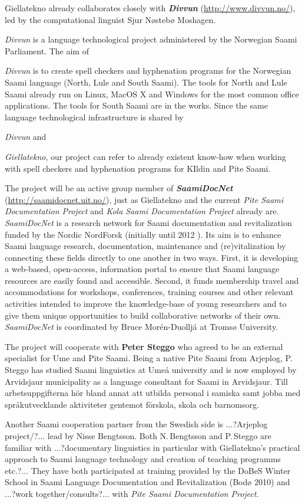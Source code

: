 \documentclass[a4paper,12pt]{article}
\begin{document}
Giellatekno already collaborates closely with \textit{\textbf{Divvun}} (\url{http://www.divvun.no/}), led by the computational linguist Sjur Nøstebø Moshagen. {\textit{Divvun} is a language technological project administered by the Norwegian Saami Parliament. The aim of {\textit{Divvun} is to create spell checkers and hyphenation programs for the Norwegian Saami language (North, Lule and South Saami). The tools for North and Lule Saami already run on Linux, MacOS X and Windows for the most common office applications. The tools for South Saami are in the works. Since the same language technological infrastructure is shared by {\textit{Divvun} and {\textit{Giellatekno}, our project can refer to already existent know-how when working with spell checkers and hyphenation programs for KIldin and Pite Saami.

The project will be an active group member of \textit{\textbf{SaamiDocNet}} (\url{http://saamidocnet.uit.no/}), just as Giellatekno and the current {\it Pite Saami Documentation Project} and {\it Kola Saami Documentation Project} already are. {\it SaamiDocNet} is a research network for Saami documentation and revitalization funded by the Nordic NordForsk (initially until 2012%
 ). Its aim is to enhance Saami language research, documentation, maintenance and (re)vitalization by connecting these fields directly to one another in two ways. First, it is developing a web-based, open-access, information portal to ensure that Saami language resources are easily found and accessible. Second, it funds membership travel and accommodations for workshops, conferences, training courses and other relevant activities intended to improve the knowledge-base of young researchers and to give them unique opportunities to build collaborative networks of their own. {\it SaamiDocNet} is coordinated by Bruce Morén-Duolljá at Tromsø University.
 
The project will cooperate with \textbf{Peter Steggo} who agreed to be an external specialist for Ume and Pite Saami. Being a native Pite Saami from Arjeplog, P.\,Steggo has studied Saami linguistics at Umeå university and is now employed by Arvidsjaur municipality as a language consultant for Saami in Arvidsjaur. Till arbetsuppgifterna hör bland annat att utbilda personal i samiska samt jobba med språkutvecklande aktiviteter gentemot förskola, skola och barnomsorg.%

Another Saami cooperation partner from the Swedish side is ...?Arjeplog project/?... lead by Nisse Bengtsson. Both N.\,Bengtsson and P.\,Steggo are familiar with ...?documentary linguistics in particular with Giellatekno's practical approach to Saami language technology and creation of teaching programms etc.?... They have both participated at training provided by the DoBeS Winter School in Saami Language Documentation and Revitalization (Bodø 2010) and ...?work together/consults?... with {\it Pite Saami Documentation Project}. 

}}}}
\end{document}
